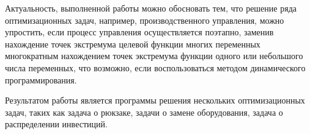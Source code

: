 Актуальность, выполненной работы можно обосновать тем, что решение ряда оптимизационных задач, например, производственного управления, можно упростить, если процесс управления осуществляется поэтапно, заменив нахождение точек экстремума целевой функции многих переменных многократным нахождением точек экстремума функции одного или небольшого числа переменных, что возможно, если воспользоваться методом динамического программирования.

Результатом работы является программы решения нескольких оптимизационных задач, таких как задача о рюкзаке, задачи о замене оборудования, задача о распределении инвестиций.
